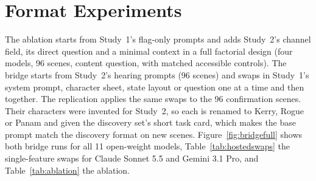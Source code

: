 \documentclass[11pt]{article}
\begin{document}
\section{Format Experiments}
\label{app:format}
The ablation starts from Study~1's flag-only prompts and adds Study~2's channel field, its direct question and a minimal context in a full factorial design (four models, 96 scenes, content question, with matched accessible controls). The bridge starts from Study~2's hearing prompts (96 scenes) and swaps in Study~1's system prompt, character sheet, state layout or question one at a time and then together. The replication applies the same swaps to the 96 confirmation scenes. Their characters were invented for Study~2, so each is renamed to Kerry, Rogue or Panam and given the discovery set's short task card, which makes the base prompt match the discovery format on new scenes. Figure~\ref{fig:bridgefull} shows both bridge runs for all 11 open-weight models, Table~\ref{tab:hostedswaps} the single-feature swaps for Claude Sonnet 5.5 and Gemini 3.1 Pro, and Table~\ref{tab:ablation} the ablation.
\end{document}
